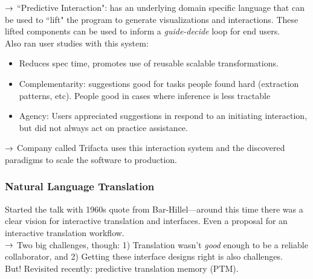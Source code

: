 $\rightarrow$ ``Predictive Interaction": has an underlying domain specific language that can be used to ``lift" the program to generate visualizations and interactions. These lifted components can be used to inform a {\it guide-decide} loop for end users. \\

Also ran user studies with this system:
\begin{itemize}
\item Reduces spec time, promotes use of reusable scalable transformations.

\item Complementarity: suggestions good for tasks people found hard (extraction patterns, etc). People good in cases where inference is less tractable
\item Agency: Users appreciated suggestions in respond to an initiating interaction, but did not always act on practice assistance.
\end{itemize}

$\rightarrow$ Company called Trifacta uses this interaction system and the discovered paradigms to scale the software to production. \\


\subsubsection{Natural Language Translation}

Started the talk with 1960s quote from Bar-Hillel---around this time there was a clear vision for interactive translation and interfaces. Even a proposal for an interactive translation workflow. \\




$\rightarrow$ Two big challenges, though: 1) Translation wasn't {\it good} enough to be a reliable collaborator, and 2) Getting these interface designs right is also challenges. \\

But! Revisited recently: predictive translation memory (PTM).

